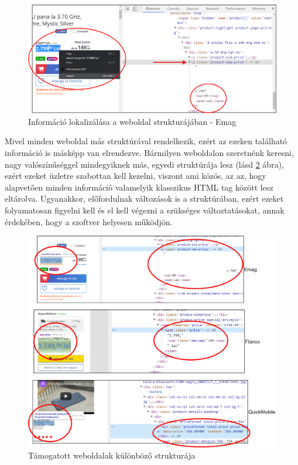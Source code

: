 \begin{figure}[H]
    \centering
    \includegraphics[scale=0.93]{figures/images/inspect_screenshot.png}
    \caption{Információ lokalizálása a weboldal strukturájában - Emag}
    \label{fig:inspect_screenshot}
\end{figure}

Mivel minden weboldal más struktúrával rendelkezik, ezért az ezeken található információ is másképp van elrendezve. Bármilyen weboldalon szeretnénk keresni, nagy valószínűséggel mindegyiknek más, egyedi struktúrája lesz (lásd \ref{fig:webshop_different_structure} ábra), ezért ezeket üzletre szabottan kell kezelni, viszont ami közös, az az, hogy alapvetően minden információ valamelyik klasszikus HTML tag között lesz eltárolva. Ugyanakkor, előfordulnak változások is a struktúrában, ezért ezeket folyamatosan figyelni kell és el kell végezni a szükséges változtatásokat, annak érdekében, hogy a szoftver helyesen működjön. 

\begin{figure}[H]
    \centering
    \includegraphics[scale=0.95]{figures/images/webshop_different_structure.png}
    \caption{Támogatott weboldalak különböző strukturája}
    \label{fig:webshop_different_structure}
\end{figure}

